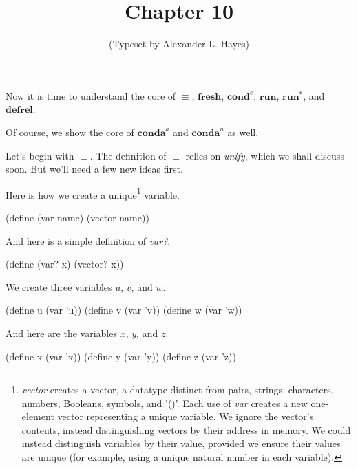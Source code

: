 \documentclass[letterpaper]{article}
\begin{document}
\title{Chapter 10}

\author{(Typeset by Alexander L. Hayes)}

\maketitle

Now it is time to understand the core of $\equiv$, $\mathbf{fresh}$, $\mathbf{cond}^{e}$,
$\mathbf{run}$, $\mathbf{run^{*}}$, and $\mathbf{defrel}$.

Of course, we show the core of $\mathbf{conda}^{a}$ and $\mathbf{conda}^{u}$ as well.

Let's begin with $\equiv$. The definition of $\equiv$ relies on \textit{unify}, which
we shall discuss soon. But we'll need a few new ideas first.

\hrulefill

Here is how we create a unique\footnote{
  \textit{vector} creates a vector, a datatype distinct
  from pairs, strings, characters, numbers, Booleans, symbols, and \scheme'()'. Each use of
  \textit{var} creates a new one-element vector representing a unique variable. We ignore the
  vector's contents, instead distinguishing vectors by their address in memory. We could instead
  distinguish variables by their value, provided we ensure their values are unique (for example,
  using a unique natural number in each variable).
}
variable.

\begin{schemedisplay}
  (define (var name) (vector name))
\end{schemedisplay}

And here is a simple definition of \textit{var?}.

\begin{schemedisplay}
  (define (var? x) (vector? x))
\end{schemedisplay}

\hrulefill

We create three variables $u$, $v$, and $w$.

\begin{schemedisplay}
  (define u (var 'u))
  (define v (var 'v))
  (define w (var 'w))
\end{schemedisplay}

And here are the variables $x$, $y$, and $z$.

\begin{schemedisplay}
  (define x (var 'x))
  (define y (var 'y))
  (define z (var 'z))
\end{schemedisplay}
\end{document}
